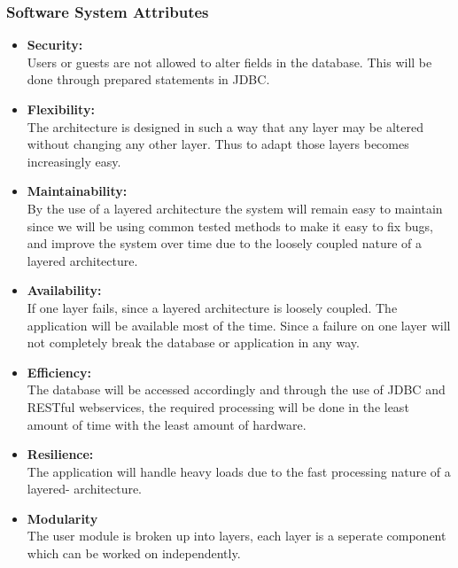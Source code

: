 \documentclass{article}
\begin{document}
 	\subsubsection{Software System Attributes}
 	\begin{itemize}
 		\item \textbf{Security:}
 		\\Users or guests are not allowed to alter fields in the database. This will be done through prepared statements in JDBC.
 		
 		\item \textbf{Flexibility:}
 		\\The architecture is designed in such a way that any layer  may be altered without changing any other layer. Thus to adapt those layers becomes increasingly easy.
 		
 		\item \textbf{Maintainability:}
 		\\By the use of a layered architecture the system will remain easy to maintain since we will be using common tested methods to make it easy to fix bugs, and improve the system over time due to the loosely coupled nature of a layered architecture.
 		
 		\item \textbf{Availability:}
 		\\If one layer fails, since a layered architecture is loosely coupled. The application will be available most of the time. Since a failure on one layer will not completely break the database or application in any way.
 		
 		\item \textbf{Efficiency:}
 		\\The database will be accessed accordingly and through the use of JDBC and RESTful webservices, the required processing will be done in the least amount of time with the least amount of hardware.
 		
 		\item \textbf{Resilience:}
 		\\The application will handle heavy loads due to the fast processing nature of a layered- architecture.
 		
 		\item \textbf{Modularity}
 		\\The user module is broken up into layers, each layer is a seperate component which can be worked on independently.
 	\end{itemize}
			
\end{document}
